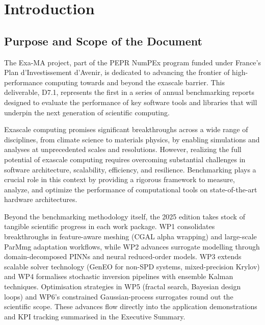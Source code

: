
\clearpage
\section{Introduction}
\label{sec:introduction}


\subsection{Purpose and Scope of the Document}
\label{sec:purpose}


The Exa-MA project, part of the PEPR NumPEx program funded under France’s Plan d’Investissement d’Avenir, is dedicated to advancing the frontier of high-performance computing towards and beyond the exascale barrier. This deliverable, D7.1, represents the first in a series of annual benchmarking reports designed to evaluate the performance of key software tools and libraries that will underpin the next generation of scientific computing.

Exascale computing promises significant breakthroughs across a wide range of disciplines, from climate science to materials physics, by enabling simulations and analyses at unprecedented scales and resolutions. However, realizing the full potential of exascale computing requires overcoming substantial challenges in software architecture, scalability, efficiency, and resilience. Benchmarking plays a crucial role in this context by providing a rigorous framework to measure, analyze, and optimize the performance of computational tools on state-of-the-art hardware architectures.

Beyond the benchmarking methodology itself, the 2025 edition takes stock of tangible scientific progress in each work package. WP1 consolidates breakthroughs in feature-aware meshing (CGAL alpha wrapping) and large-scale ParMmg adaptation workflows, while WP2 advances surrogate modelling through domain-decomposed PINNs and neural reduced-order models. WP3 extends scalable solver technology (GenEO for non-SPD systems, mixed-precision Krylov) and WP4 formalises stochastic inversion pipelines with ensemble Kalman techniques. Optimisation strategies in WP5 (fractal search, Bayesian design loops) and WP6’s constrained Gaussian-process surrogates round out the scientific scope. These advances flow directly into the application demonstrations and KPI tracking summarised in the Executive Summary.

